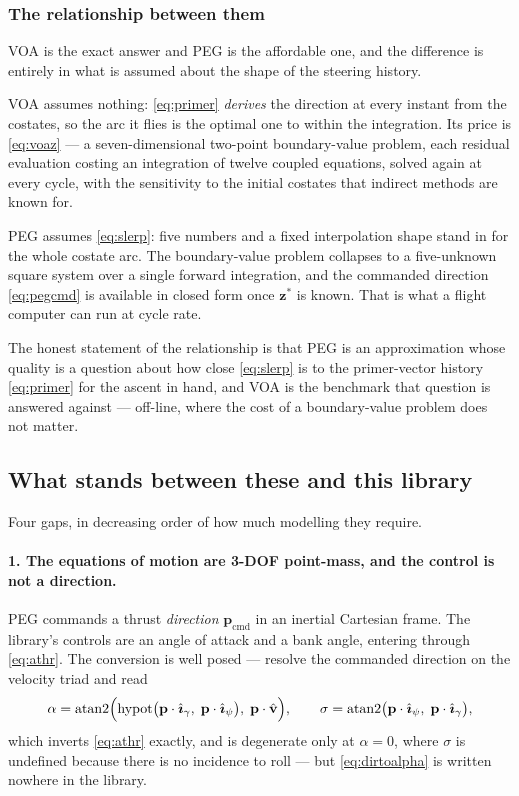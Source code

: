 \documentclass[11pt]{article}
\newcommand{\vhat}{\hat{\mathbf{v}}}
\newcommand{\ig}{\hat{\boldsymbol{\imath}}_{\gamma}}
\newcommand{\ip}{\hat{\boldsymbol{\imath}}_{\psi}}
\begin{document}
\subsubsection{The relationship between them}

VOA is the exact answer and PEG is the affordable one, and the difference is
entirely in what is assumed about the shape of the steering history.

VOA assumes nothing: \eqref{eq:primer} \emph{derives} the direction at every
instant from the costates, so the arc it flies is the optimal one to within the
integration. Its price is \eqref{eq:voaz} --- a seven-dimensional two-point
boundary-value problem, each residual evaluation costing an integration of
twelve coupled equations, solved again at every cycle, with the sensitivity to
the initial costates that indirect methods are known for.

PEG assumes \eqref{eq:slerp}: five numbers and a fixed interpolation shape
stand in for the whole costate arc. The boundary-value problem collapses to a
five-unknown square system over a single forward integration, and the
commanded direction \eqref{eq:pegcmd} is available in closed form once
$\mathbf{z}^{*}$ is known. That is what a flight computer can run at cycle
rate.

The honest statement of the relationship is that PEG is an approximation whose
quality is a question about how close \eqref{eq:slerp} is to the primer-vector
history \eqref{eq:primer} for the ascent in hand, and VOA is the benchmark that
question is answered against --- off-line, where the cost of a boundary-value
problem does not matter.

\subsection{What stands between these and this library}
\label{sec:guidancegaps}

Four gaps, in decreasing order of how much modelling they require.

\paragraph{1. The equations of motion are 3-DOF point-mass, and the control is
not a direction.} PEG commands a thrust \emph{direction}
$\mathbf{p}_{\text{cmd}}$ in an inertial Cartesian frame. The library's
controls are an angle of attack and a bank angle, entering through
\eqref{eq:athr}. The conversion is well posed --- resolve the commanded
direction on the velocity triad and read
\begin{equation}
  \alpha = \operatorname{atan2}\Bigl(
             \operatorname{hypot}\bigl(\mathbf{p}\cdot\ig,\;
                                       \mathbf{p}\cdot\ip\bigr),\;
             \mathbf{p}\cdot\vhat\Bigr),
  \qquad
  \sigma = \operatorname{atan2}\bigl(\mathbf{p}\cdot\ip,\;
                                     \mathbf{p}\cdot\ig\bigr),
  \label{eq:dirtoalpha}
\end{equation}
which inverts \eqref{eq:athr} exactly, and is degenerate only at $\alpha=0$,
where $\sigma$ is undefined because there is no incidence to roll --- but
\eqref{eq:dirtoalpha} is written nowhere in the library.
\end{document}
